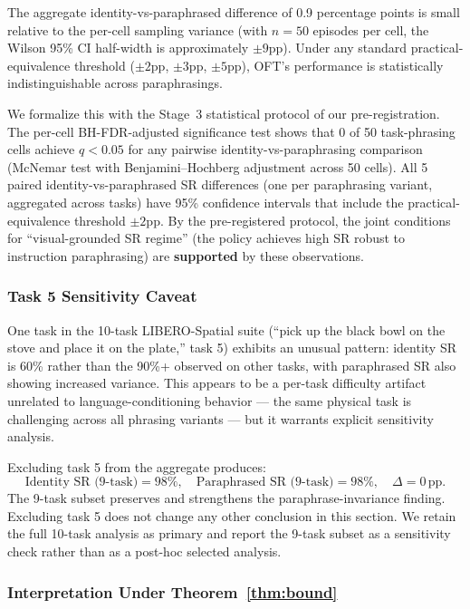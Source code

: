 The aggregate identity-vs-paraphrased difference of 0.9 percentage points is small
relative to the per-cell sampling variance (with $n = 50$ episodes per cell, the Wilson
95\% CI half-width is approximately $\pm 9$pp). Under any standard practical-equivalence
threshold ($\pm 2$pp, $\pm 3$pp, $\pm 5$pp), OFT's performance is statistically
indistinguishable across paraphrasings.

We formalize this with the Stage~3 statistical protocol of our pre-registration. The
per-cell BH-FDR-adjusted significance test shows that 0 of 50 task-phrasing cells achieve
$q < 0.05$ for any pairwise identity-vs-paraphrasing comparison (McNemar test with
Benjamini--Hochberg adjustment across 50 cells). All 5 paired identity-vs-paraphrased SR
differences (one per paraphrasing variant, aggregated across tasks) have 95\% confidence
intervals that include the practical-equivalence threshold $\pm 2$pp. By the
pre-registered protocol, the joint conditions for ``visual-grounded SR regime'' (the
policy achieves high SR robust to instruction paraphrasing) are \textbf{supported} by
these observations.

\subsubsection{Task 5 Sensitivity Caveat}
\label{sec:results:paraphrase:task5}

One task in the 10-task LIBERO-Spatial suite (``pick up the black bowl on the stove and
place it on the plate,'' task 5) exhibits an unusual pattern: identity SR is 60\% rather
than the 90\%+ observed on other tasks, with paraphrased SR also showing increased
variance. This appears to be a per-task difficulty artifact unrelated to
language-conditioning behavior --- the same physical task is challenging across all
phrasing variants --- but it warrants explicit sensitivity analysis.

Excluding task 5 from the aggregate produces:
\begin{equation}
\text{Identity SR (9-task)} = 98\%, \quad
\text{Paraphrased SR (9-task)} = 98\%, \quad
\Delta = 0\,\text{pp}.
\end{equation}
The 9-task subset preserves and strengthens the paraphrase-invariance finding. Excluding
task 5 does not change any other conclusion in this section. We retain the full 10-task
analysis as primary and report the 9-task subset as a sensitivity check rather than as a
post-hoc selected analysis.

\subsubsection{Interpretation Under Theorem~\ref{thm:bound}}
\label{sec:results:paraphrase:interpretation}

